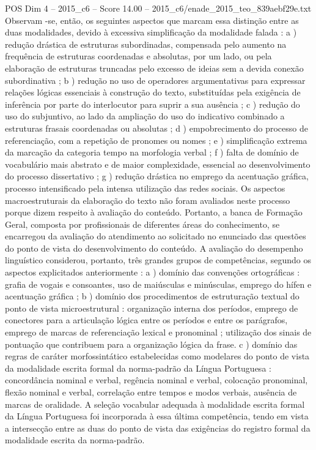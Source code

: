 \begin{textsample}{POS Dim 4 – 2015\_c6 – Score 14.00 – 2015\_c6/enade\_2015\_teo\_839aebf29e.txt}
Observam -se, então, os seguintes aspectos que marcam essa distinção entre as duas modalidades, devido à excessiva simplificação da modalidade falada : a ) redução drástica de estruturas subordinadas, compensada pelo aumento na frequência de estruturas coordenadas e absolutas, por um lado, ou pela elaboração de estruturas truncadas pelo excesso de ideias sem a devida conexão subordinativa ; b ) redução no uso de operadores argumentativas para expressar relações lógicas essenciais à construção do texto, substituídas pela exigência de inferência por parte do interlocutor para suprir a sua ausência ; c ) redução do uso do subjuntivo, ao lado da ampliação do uso do indicativo combinado a estruturas frasais coordenadas ou absolutas ; d ) empobrecimento do processo de referenciação, com a repetição de pronomes ou nomes ; e ) simplificação extrema da marcação da categoria tempo na morfologia verbal ; f ) falta de domínio de vocabulário mais abstrato e de maior complexidade, essencial ao desenvolvimento do processo dissertativo ; g ) redução drástica no emprego da acentuação gráfica, processo intensificado pela intensa utilização das redes sociais.
Os aspectos macroestruturais da elaboração do texto não foram avaliados neste processo porque dizem respeito à avaliação do conteúdo.
Portanto, a banca de Formação Geral, composta por profissionais de diferentes áreas do conhecimento, se encarregou da avaliação do atendimento ao solicitado no enunciado das questões do ponto de vista do desenvolvimento do conteúdo.
A avaliação do desempenho linguístico considerou, portanto, três grandes grupos de competências, segundo os aspectos explicitados anteriormente : a ) domínio das convenções ortográficas : grafia de vogais e consoantes, uso de maiúsculas e minúsculas, emprego do hífen e acentuação gráfica ; b ) domínio dos procedimentos de estruturação textual do ponto de vista microestrutural : organização interna dos períodos, emprego de conectores para a articulação lógica entre os períodos e entre os parágrafos, emprego de marcas de referenciação lexical e pronominal ; utilização dos sinais de pontuação que contribuem para a organização lógica da frase. c ) domínio das regras de caráter morfossintático estabelecidas como modelares do ponto de vista da modalidade escrita formal da norma-padrão da Língua Portuguesa : concordância nominal e verbal, regência nominal e verbal, colocação pronominal, flexão nominal e verbal, correlação entre tempos e modos verbais, ausência de marcas de oralidade.
A seleção vocabular adequada à modalidade escrita formal da Língua Portuguesa foi incorporada à essa última competência, tendo em vista a intersecção entre as duas do ponto de vista das exigências do registro formal da modalidade escrita da norma-padrão.

\end{textsample}
